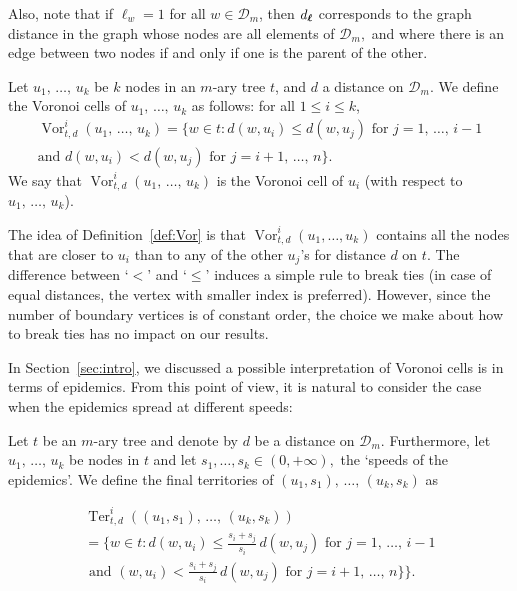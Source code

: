 \documentclass[AHL,Unicode,longabstracts,published]{cedram}
\newcommand{\Vor}{\operatorname{Vor}}
\newcommand{\Ter}{\operatorname{Ter}}
\newcommand{\bs}{\ensuremath{\boldsymbol}}
\newcommand{\clD}{\mathcal{D}}
\begin{document}
Also, note that if $\ell_w=1$ for all $w\in\clD_m$, then $d_{\bs \ell}$ corresponds to the graph distance in the graph whose nodes are all elements of $\clD_m,$ and where there is an edge between two nodes if and only if one is the parent of the other.

\begin{defi}\label{def:Vor}
Let $u_1, \,\ldots,\, u_k$ be $k$ nodes in an $m$-ary tree $t$, and $d$ a distance on $\clD_m$. We define the Voronoi cells of $u_1, \,\ldots,\, u_k$ as follows: for all $1\leq i\leq k$,
\begin{multline*}
\Vor_{t,d}^{i}(u_1, \,\ldots,\, u_k) =\big\{w\in t \colon d(w,u_i)\le d(w,u_j)\text{ for }j=1,\,\dots,\,i-1 \\ \text{and } d(w,u_i)<d(w,u_j)\text{ for }j=i+1,\,\dots,\,n \big \}.
\end{multline*}
We say that $\Vor_{t,d}^i(u_1, \,\ldots,\, u_k)$ is the Voronoi cell of $u_i$ (with respect to $u_1, \,\ldots,\, u_k$).
\end{defi}

\begin{rema}
The idea of Definition~\ref{def:Vor} is that $\Vor_{t,d}^i(u_1, \ldots, u_k)$ contains all the nodes that are closer to $u_i$ than to any of the other $u_j$'s for distance $d$ on $t$. The difference between `$<$' and `$\le$' induces a simple rule to break ties (in case of equal distances, the vertex with smaller index is preferred). However, since the number of boundary vertices is of constant order, the choice we make about how to break ties has no impact on our results.
\end{rema}

In Section~\ref{sec:intro}, we discussed a possible interpretation of Voronoi cells is in terms of epidemics. From this point of view, it is natural to consider the case when the epidemics spread at different speeds:

\begin{defi}
Let $t$ be an $m$-ary tree and denote by $d$ be a distance on $\clD_m.$ Furthermore, let $u_1,\, \ldots,\, u_k$ be nodes in $t$ and let $s_1, \ldots, s_k\in (0,+\infty),$ the \lq speeds of the epidemics\rq. We define the final territories of $(u_1,s_1), \,\ldots,\, (u_k, s_k)$ as

\begin{multline*}
\Ter_{t,d}^i((u_1, s_1), \,\ldots,\, (u_k, s_k))\\
=\Big\{w\in t \colon d(w,u_i) \le \frac{s_i+s_j}{s_i}\,d(w,u_j) \text{ for }j=1,\,\dots,\,i-1 \\
\text{ and }(w,u_i)< \frac{s_i+s_j}{s_i}\,d(w,u_j)
\text{ for }j=i+1,\,\dots,\,n\} \Big\}.
\end{multline*}
\end{defi}
\end{document}
